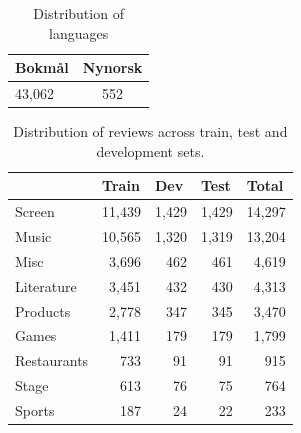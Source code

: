 \begin{table}[]
	\centering
	\begin{tabular}{@{}ll@{}}
		\toprule
		Bokmål & Nynorsk                 \\ \midrule
		43,062 & \multicolumn{1}{c}{552}
	\end{tabular}
	\caption{Distribution of languages}
\end{table}
\begin{table}[]
	\centering
	\begin{tabular}{@{}lrrrr@{}}
		\toprule
		& \multicolumn{1}{l}{Train} & \multicolumn{1}{l}{Dev} & \multicolumn{1}{l}{Test} & \multicolumn{1}{l}{Total} \\ \midrule
		Screen      & 11,439                    & 1,429                   & 1,429                    & 14,297                    \\
		Music       & 10,565                    & 1,320                   & 1,319                    & 13,204                    \\
		Misc        & 3,696                     & 462                     & 461                      & 4,619                     \\
		Literature  & 3,451                     & 432                     & 430                      & 4,313                     \\
		Products    & 2,778                     & 347                     & 345                      & 3,470                     \\
		Games       & 1,411                     & 179                     & 179                      & 1,799                     \\
		Restaurants & 733                       & 91                      & 91                       & 915                       \\
		Stage       & 613                       & 76                      & 75                       & 764                       \\
		Sports      & 187                       & 24                      & 22                       & 233                       \\ \bottomrule
	\end{tabular}
	\caption{Distribution of reviews across train, test and development sets.}
	\label{tab:split_dist}
\end{table}
